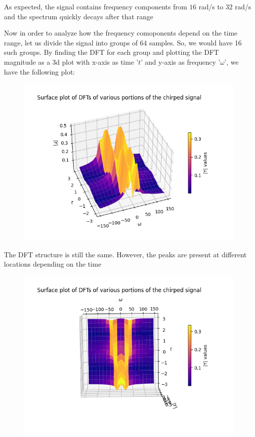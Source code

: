 \documentclass[12pt, a4paper]{article}
\begin{document}
\begin{center}
    As expected, the signal contains frequency components from $16$ rad/s to $32$ rad/s and the spectrum quickly decays after that range
\end{center}
Now in order to analyze how the frequency comoponents depend on the time range, let us divide the signal into groups of 64 samples. So, we would have 16 such groups. By finding the DFT for each group and plotting the DFT magnitude as a 3d plot with x-axis as time '$t$' and y-axis as frequency '$\omega$', we have the following plot:
\begin{figure}[H]
    \centering
    \includegraphics[scale = 0.8]{Figure_15.png}
    \label{fig:sample}
\end{figure}
\begin{center}
    The DFT structure is still the same. However, the peaks are present at different locations depending on the time    
\end{center}
\begin{figure}[H]
    \centering
    \includegraphics[scale = 0.8]{Figure_16.png}
    \label{fig:sample}
\end{figure}
\end{document}
